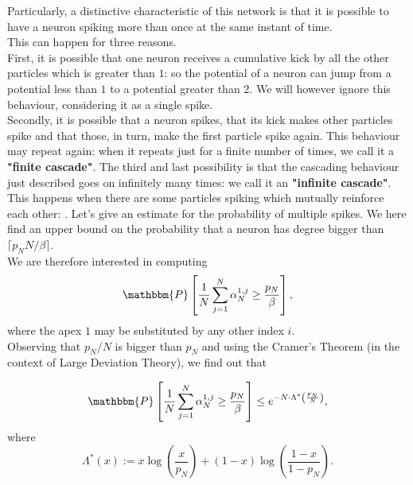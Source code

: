 Particularly, a distinctive characteristic of this network is that it is possible to have a neuron spiking more than once at the same instant of time. \\
This can happen for three reasons. \\
First, it is possible that one neuron receives a cumulative kick by all the other particles which is greater than $1$: so the potential of a neuron can jump from a potential less than $1$ to a potential greater than $2$. We will however ignore this behaviour, considering it as a single spike. \\
Secondly, it is possible that a neuron spikes, that its kick makes other particles spike and that those, in turn, make the first particle spike again. This behaviour may repeat again: when it repeats just for a finite number of times, we call it a \textbf{"finite cascade"}.
The third and last possibility is that the cascading behaviour just described goes on infinitely many times: we call it an \textbf{"infinite cascade"}. This happens when there are some particles spiking which mutually reinforce each other: .
Let's give an estimate for the probability of multiple spikes.
We here find an upper bound on the probability that a neuron has degree bigger than $\lceil p_N N / \beta \rceil$. \\
We are therefore interested in computing \[ \mathbbm{P} \left[ \frac{1}{N} \sum_{j = 1}^N \alpha^{1, j}_N \geq \frac{p_N}{\beta} \right], \] where the apex $1$ may be substituted by any other index $i$. \\


Observing that $p_N / N$ is bigger than $p_N$ and using the Cramer's Theorem (in the context of Large Deviation Theory), we find out that 

\begin{equation}\label{upperbound}
\mathbbm{P} \left[ \frac{1}{N} \sum_{j = 1}^N \alpha^{1, j}_N \geq \frac{p_N}{\beta} \right] \leq e^{- N \cdot \Lambda^* \left( \frac{p_N}{N} \right) }, \end{equation}
 where \[ \Lambda^*(x) := x \log \left( \frac{x}{p_N} \right) + (1-x) \log \left( \frac{1 - x}{1 - p_N} \right).\]

